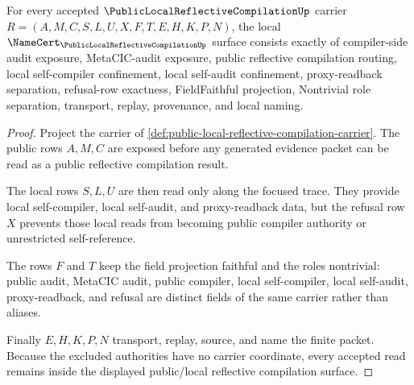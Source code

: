 \begin{theorem}
\label{thm:public-local-reflective-compilation-namecert-obligations}
For every accepted $\PublicLocalReflectiveCompilationUp$ carrier $R=(A,M,C,S,L,U,X,F,T,E,H,K,P,N)$, the local $\NameCert_{\PublicLocalReflectiveCompilationUp}$ surface consists exactly of compiler-side audit exposure, MetaCIC-audit exposure, public reflective compilation routing, local self-compiler confinement, local self-audit confinement, proxy-readback separation, refusal-row exactness, FieldFaithful projection, Nontrivial role separation, transport, replay, provenance, and local naming.
\end{theorem}
\begin{proof}
Project the carrier of \autoref{def:public-local-reflective-compilation-carrier}. The public rows $A,M,C$ are exposed before any generated evidence packet can be read as a public reflective compilation result.

The local rows $S,L,U$ are then read only along the focused trace. They provide local self-compiler, local self-audit, and proxy-readback data, but the refusal row $X$ prevents those local reads from becoming public compiler authority or unrestricted self-reference.

The rows $F$ and $T$ keep the field projection faithful and the roles nontrivial: public audit, MetaCIC audit, public compiler, local self-compiler, local self-audit, proxy-readback, and refusal are distinct fields of the same carrier rather than aliases.

Finally $E,H,K,P,N$ transport, replay, source, and name the finite packet. Because the excluded authorities have no carrier coordinate, every accepted read remains inside the displayed public/local reflective compilation surface.
\end{proof}

